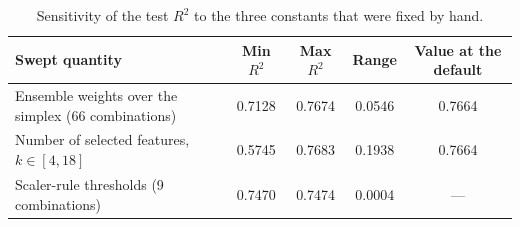 \begin{table}[htbp]
\centering
\caption{Sensitivity of the test $R^2$ to the three constants that were fixed by hand.}\label{tab:sensitivity}
\small
\begin{tabular}{lcccc}
\toprule
Swept quantity & Min $R^2$ & Max $R^2$ & Range & Value at the default \\
\midrule
Ensemble weights over the simplex (66 combinations) & 0.7128 & 0.7674 & 0.0546 & 0.7664 \\
Number of selected features, $k \in [4, 18]$ & 0.5745 & 0.7683 & 0.1938 & 0.7664 \\
Scaler-rule thresholds (9 combinations) & 0.7470 & 0.7474 & 0.0004 & --- \\
\bottomrule
\end{tabular}
\end{table}